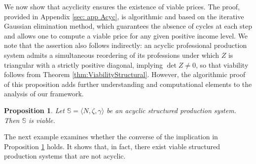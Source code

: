 \documentclass[11pt,fleqn]{article}
\newtheorem{proposition}[theorem]{Proposition}
\begin{document}
\noindent
We now show that acyclicity ensures the existence of viable prices. The proof, provided in Appendix \ref{sec: app Acyc}, is algorithmic and based on the iterative Gaussian elimination method, which guarantees the absence of cycles at each step and allows one to compute a viable price for any given positive income level. We note that the assertion also follows indirectly: an acyclic professional production system admits a simultaneous reordering of its professions under which $Z$ is triangular with a strictly positive diagonal, implying $\det Z \neq 0$, so that viability follows from Theorem \ref{thm:ViabilityStructural}. However, the algorithmic proof of this proposition adds further understanding and computational elements to the analysis of our framework.

\begin{proposition}\label{prop: acyclic implies viable}
 Let $\mathbb S = \langle N, \zeta , \gamma \rangle$ be an acyclic structured production system. Then  $\mathbb S$ is viable. 
\end{proposition}

\noindent
The next example examines whether the converse of the implication in Proposition \ref{prop: acyclic implies viable} holds. It shows that, in fact, there exist viable structured production systems that are not acyclic.
\end{document}
